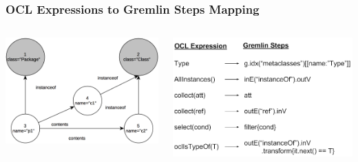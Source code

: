 \documentclass[10pt]{beamer}
\begin{document}
\begin{frame}[c]\frametitle{OCL Expressions to Gremlin Steps Mapping}
	\begin{columns}
		\begin{column}{0.5\textwidth}
    \begin{center}
      \includegraphics[width=\textwidth]{mogwai-graph.png}
    \end{center}			
		\end{column}
		\begin{column}{0.5\textwidth}
    \begin{center}
      \includegraphics[width=\textwidth]{mogwai-mapping.png}
    \end{center}			
		\end{column}
	\end{columns}
\end{frame}
\end{document}

